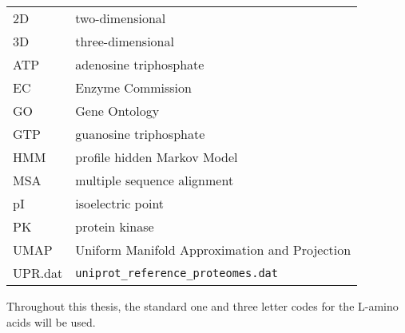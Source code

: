 
\begin{longtable}[l]{ l l }
  2D & two-dimensional \\
  3D & three-dimensional \\
  ATP & adenosine triphosphate \\
  EC & Enzyme Commission \\
  GO & Gene Ontology \\
  GTP & guanosine triphosphate \\
  HMM & profile hidden Markov Model \\
  MSA & multiple sequence alignment \\
  pI & isoelectric point \\
  PK & protein kinase \\
  UMAP & Uniform Manifold Approximation and Projection \\
  UPR.dat & \texttt{uniprot\_reference\_proteomes.dat} \\
\end{longtable}

Throughout this thesis, the standard one and three letter codes for the L-amino acids will
be used.
